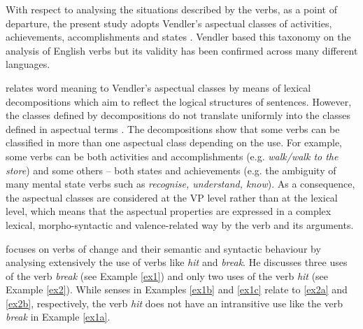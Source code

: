 \documentclass[output=paper,colorlinks,citecolor=brown]{langscibook}
\begin{document}

With respect to analysing the situations described by the verbs, as a point of departure, the present study adopts Vendler's aspectual classes of activities, achievements, accomplishments and states \citep{Vendler1957,Vendler1967}. Vendler based this taxonomy on the analysis of English verbs but its validity has been confirmed across many different languages.

\citet[37--132]{Dowty1979} relates word meaning to Vendler's aspectual classes by means of lexical decompositions which aim to reflect the logical structures of sentences. However, the classes defined by decompositions do not translate uniformly into the classes defined in aspectual terms \citep[16--20]{RappaportHovav2008}. The decompositions show that some verbs can be classified in more than one aspectual class depending on the use. For example, some verbs can be both activities and accomplishments (e.g. \textit{walk\slash walk to the store}) and some others -- both  states and achievements (e.g. the ambiguity of many mental state verbs such as \textit{recognise, understand, know}). As a consequence, the aspectual classes are considered at the VP level rather than at the lexical level, which means that the aspectual properties are expressed in a complex lexical, morpho-syntactic and valence-related way by the verb and its arguments. 


\citet{Fillmore1970} focuses on verbs of change and their semantic and syntactic behaviour by analysing extensively the use of verbs like \textit{hit} and \textit{break}. He discusses three uses of the verb \textit{break} (see Example \ref{ex1}) and only two uses of the verb \textit{hit} (see Example \ref{ex2}). While senses in Examples \ref{ex1b} and \ref{ex1c} relate to \ref{ex2a} and \ref{ex2b}, respectively, the verb \textit{hit} does not have an intransitive use like the verb \textit{break} in Example \ref{ex1a}.
\end{document}
